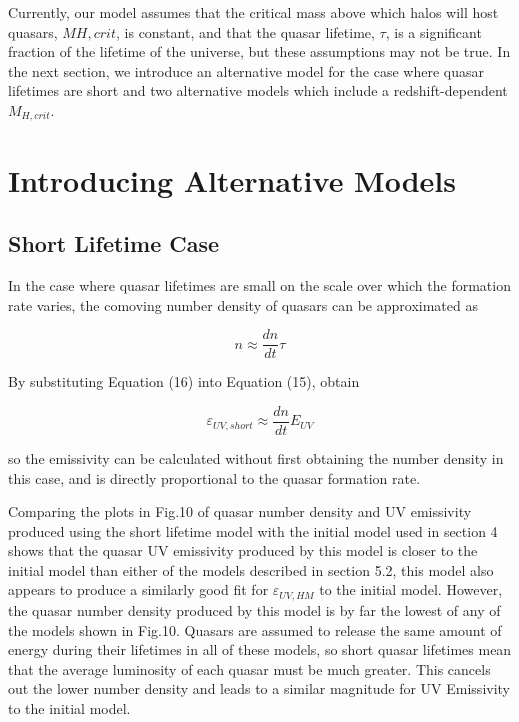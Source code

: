 \documentclass[12pt, twocolumn]{report}%
\begin{document}
\twocolumngrid


Currently, our model assumes that the critical mass above which halos will host quasars, $M{H,crit}$, is constant, and that the quasar lifetime, $\tau$, is a significant fraction of the lifetime of the universe, but these assumptions may not be true. In the next section, we introduce an alternative model for the case where quasar lifetimes are short and two alternative models which include a redshift-dependent $M_{H,crit}$.

\section{Introducing Alternative Models}

\subsection{Short Lifetime Case}

In the case where quasar lifetimes are small on the scale over which the formation rate varies, the comoving number density of quasars can be approximated as

\begin{equation}
    n\approx\frac{dn}{dt}\tau
\end{equation}

\noindent By substituting Equation (16) into Equation (15), obtain

\begin{equation}
    \varepsilon_{UV,short}\approx\frac{dn}{dt}E_{UV}
\end{equation}

\noindent so the emissivity can be calculated without first obtaining the number density in this case, and is directly proportional to the quasar formation rate.\par

Comparing the plots in Fig.10 of quasar number density and UV emissivity produced using the short lifetime model with the initial model used in section 4 shows that the quasar UV emissivity produced by this model is closer to the initial model than either of the models described in section 5.2, this model also appears to produce a similarly good fit for $\varepsilon_{UV,HM}$ to the initial model. However, the quasar number density produced by this model is by far the lowest of any of the models shown in Fig.10. Quasars are assumed to release the same amount of energy during their lifetimes in all of these models, so short quasar lifetimes mean that the average luminosity of each quasar must be much greater. This cancels out the lower number density and leads to a similar magnitude for UV Emissivity to the initial model.
\end{document}
